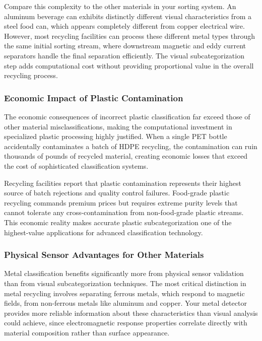 \documentclass[11pt, a4paper]{article}
\begin{document}
Compare this complexity to the other materials in your sorting system. An aluminum beverage can exhibits distinctly different visual characteristics from a steel food can, which appears completely different from copper electrical wire. However, most recycling facilities can process these different metal types through the same initial sorting stream, where downstream magnetic and eddy current separators handle the final separation efficiently. The visual subcategorization step adds computational cost without providing proportional value in the overall recycling process.

\subsubsection{Economic Impact of Plastic Contamination}

The economic consequences of incorrect plastic classification far exceed those of other material misclassifications, making the computational investment in specialized plastic processing highly justified. When a single PET bottle accidentally contaminates a batch of HDPE recycling, the contamination can ruin thousands of pounds of recycled material, creating economic losses that exceed the cost of sophisticated classification systems.

Recycling facilities report that plastic contamination represents their highest source of batch rejections and quality control failures. Food-grade plastic recycling commands premium prices but requires extreme purity levels that cannot tolerate any cross-contamination from non-food-grade plastic streams. This economic reality makes accurate plastic subcategorization one of the highest-value applications for advanced classification technology.

\subsubsection{Physical Sensor Advantages for Other Materials}

Metal classification benefits significantly more from physical sensor validation than from visual subcategorization techniques. The most critical distinction in metal recycling involves separating ferrous metals, which respond to magnetic fields, from non-ferrous metals like aluminum and copper. Your metal detector provides more reliable information about these characteristics than visual analysis could achieve, since electromagnetic response properties correlate directly with material composition rather than surface appearance.
\end{document}
